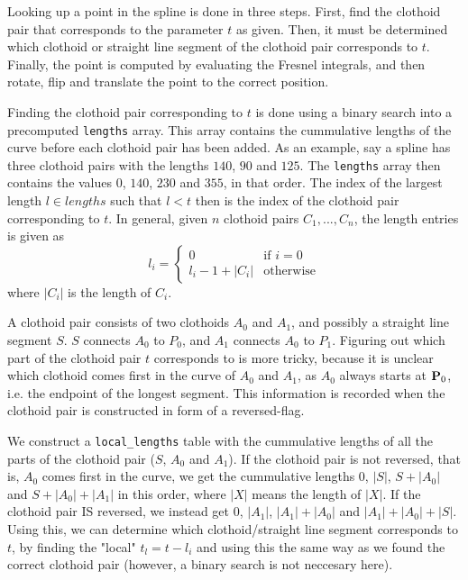 Looking up a point in the spline is done in three steps. First, find the clothoid pair that corresponds to the parameter $t$ as given. Then, it must be determined which clothoid or straight line segment of the clothoid pair corresponds to $t$. Finally, the point is computed by evaluating the Fresnel integrals, and then rotate, flip and translate the point to the correct position.  

Finding the clothoid pair corresponding to $t$ is done using a binary search into a precomputed \texttt{lengths} array. This array contains the cummulative lengths of the curve before each clothoid pair has been added. As an example, say a spline has three clothoid pairs with the lengths $140$, $90$ and $125$. The \texttt{lengths} array then contains the values $0$, $140$, $230$ and $355$, in that order. The index of the largest length $l\in lengths$ such that $l < t$ then is the index of the clothoid pair corresponding to $t$. In general, given $n$ clothoid pairs $C_1, ..., C_n$, the length entries is given as
$$
l_i = 
\begin{cases}
0 & \mbox{if $i = 0$}\\
l_i-1+|C_i| & \mbox{otherwise}
\end{cases}
$$
where $|C_i|$ is the length of $C_i$.

A clothoid pair consists of two clothoids $A_0$ and $A_1$, and possibly a straight line segment $S$. $S$ connects $A_0$ to $P_0$, and $A_1$ connects $A_0$ to $P_1$. Figuring out which part of the clothoid pair $t$ corresponds to is more tricky, because it is unclear which clothoid comes first in the curve of $A_0$ and $A_1$, as $A_0$ always starts at ${\mathbf P}_0$, i.e. the endpoint of the longest segment. This information is recorded when the clothoid pair is constructed in form of a reversed-flag.

We construct a \texttt{local\_lengths} table with the cummulative lengths of all the parts of the clothoid pair ($S$, $A_0$ and $A_1$). If the clothoid pair is not reversed, that is, $A_0$ comes first in the curve, we get the cummulative lengths $0$, $|S|$, $S+|A_0|$ and $S+|A_0|+|A_1|$ in this order, where $|X|$ means the length of $|X|$. If the clothoid pair IS reversed, we instead get $0$, $|A_1|$, $|A_1|+|A_0|$ and $|A_1|+|A_0|+|S|$. Using this, we can determine which clothoid/straight line segment corresponds to $t$, by finding the "local" $t_l = t-l_i$ and using this the same way as we found the correct clothoid pair (however, a binary search is not neccesary here).

